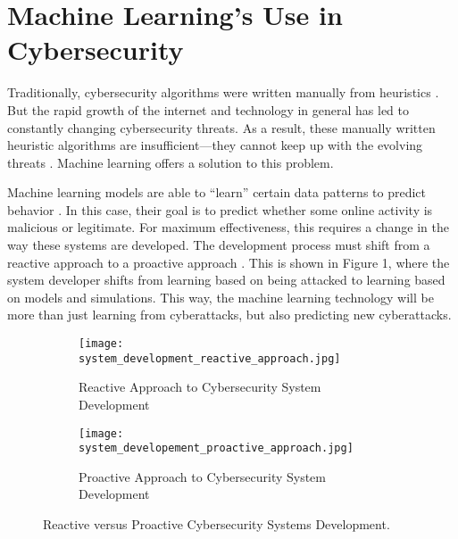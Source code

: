\section{Machine Learning's Use in Cybersecurity}

Traditionally, cybersecurity algorithms were written manually from heuristics \cite{sarker_kayes_badsha_2020}.
But the rapid growth of the internet and technology in general has led to constantly changing cybersecurity threats.
As a result, these manually written heuristic algorithms are insufficient---they cannot keep up with the evolving threats \cite{sarker_kayes_badsha_2020}.
Machine learning offers a solution to this problem.

Machine learning models are able to ``learn'' certain data patterns to predict behavior \cite{sarker_kayes_badsha_2020}.
In this case, their goal is to predict whether some online activity is malicious or legitimate.
For maximum effectiveness, this requires a change in the way these systems are developed.
The development process must shift from a reactive approach to a proactive approach \cite{comprehensive_survey_2020}.
This is shown in Figure 1, where the system developer shifts from learning based on being attacked to learning based on models and simulations.
This way, the machine learning technology will be more than just learning from cyberattacks, but also predicting new cyberattacks.

\begin{figure}[H]
    \centering
    \begin{subfigure}{0.45\textwidth}
        \texttt{[image: system\_development\_reactive\_approach.jpg]}
        \caption{Reactive Approach to Cybersecurity System Development}
    \end{subfigure}
    \hspace{0.05\textwidth}
    \begin{subfigure}{0.45\textwidth}
        \texttt{[image: system\_developement\_proactive\_approach.jpg]}
        \caption{Proactive Approach to Cybersecurity System Development}
    \end{subfigure}
    \caption[Reactive versus Proactive Cybersecurity Development]{Reactive versus Proactive Cybersecurity Systems Development. \cite{comprehensive_survey_2020}}
\end{figure}

